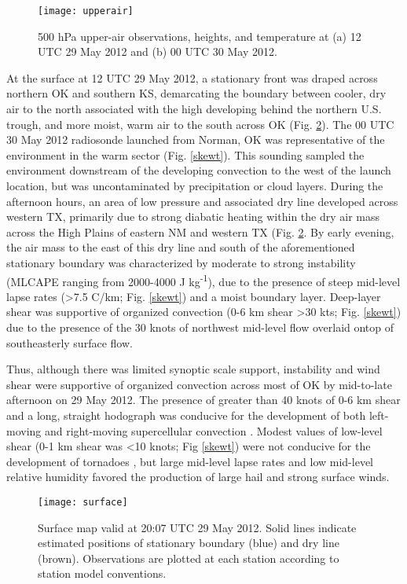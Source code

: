 \begin{figure}
\centering
\texttt{[image: upperair]}
\caption{500 hPa upper-air observations, heights, and temperature at (a) 12 UTC 29 May 2012 and (b) 00 UTC 30 May 2012.}
\label{upper}
\end{figure}

At the surface at 12 UTC 29 May 2012, a stationary front was draped across northern OK and southern KS, demarcating the boundary between cooler, dry air to the north associated with the high developing behind the northern U.S. trough, and more moist, warm air to the south across OK (Fig. \ref{surface}).  The 00 UTC 30 May 2012 radiosonde launched from Norman, OK was representative of the environment in the warm sector (Fig. \ref{skewt}). This sounding sampled the environment downstream of the developing convection to the west of the launch location, but was uncontaminated by precipitation or cloud layers. During the afternoon hours, an area of low pressure and associated dry line developed across western TX, primarily due to strong diabatic heating within the dry air mass across the High Plains of eastern NM and western TX (Fig. \ref{surface}. By early evening, the air mass to the east of this dry line and south of the aforementioned stationary boundary was characterized by moderate to strong instability (MLCAPE ranging from 2000-4000 J kg\textsuperscript{-1}), due to the presence of steep mid-level lapse rates (\textgreater 7.5 C/km; Fig. \ref{skewt}) and a moist boundary layer. Deep-layer shear was supportive of organized convection (0-6 km shear \textgreater 30 kts; Fig. \ref{skewt}) due to the presence of the 30 knots of northwest mid-level flow overlaid ontop of southeasterly surface flow.

Thus, although there was limited synoptic scale support, instability and wind shear were supportive of organized convection across most of OK by mid-to-late afternoon on 29 May 2012.  The presence of greater than 40 knots of 0-6 km shear and a long, straight hodograph was conducive for the development of both left-moving and right-moving supercellular convection \citep{klempwilhelmson78}. Modest values of low-level shear (0-1 km shear was \textless 10 knots; Fig \ref{skewt}) were not conducive for the development of tornadoes \citep{thompsonetal03}, but large mid-level lapse rates and low mid-level relative humidity favored the production of large hail and strong surface winds.

\begin{figure}
\centering
\texttt{[image: surface]}
\caption{Surface map valid at 20:07 UTC 29 May 2012. Solid lines indicate estimated positions of stationary boundary (blue) and dry line (brown). Observations are plotted at each station according to station model conventions.}
\label{surface}
\end{figure}

